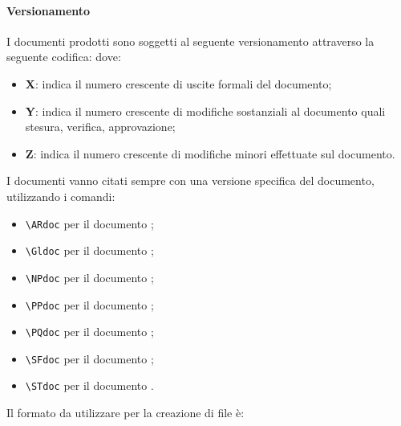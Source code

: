 	\paragraph{Versionamento}
	I documenti prodotti sono soggetti al seguente versionamento attraverso la seguente codifica:
	dove:
	\begin{itemize}
		\item \textbf{X}: indica il numero crescente di uscite formali del documento;
		\item \textbf{Y}: indica il numero crescente di modifiche sostanziali al documento quali stesura, verifica, approvazione;
		\item \textbf{Z}: indica il numero crescente di modifiche minori effettuate sul documento.
	\end{itemize}
	I documenti vanno citati sempre con una versione specifica del documento, utilizzando i comandi:
	\begin{itemize}
		\item \texttt{\textbackslash ARdoc} per il documento \ARdoc;
		\item \texttt{\textbackslash Gldoc} per il documento \Gldoc;
		\item \texttt{\textbackslash NPdoc} per il documento \NPdoc;
		\item \texttt{\textbackslash PPdoc} per il documento \PPdoc;
		\item \texttt{\textbackslash PQdoc} per il documento \PQdoc;
		\item \texttt{\textbackslash SFdoc} per il documento \SFdoc;
		\item \texttt{\textbackslash STdoc} per il documento \STdoc.
	\end{itemize}
	Il formato da utilizzare per la creazione di file è:

